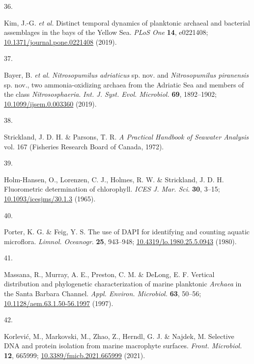 \documentclass[
  12pt,
]{article}
\newlength{\cslhangindent}
\newlength{\csllabelwidth}
\newlength{\cslentryspacingunit} %
\newenvironment{CSLReferences}[2] %
 {%
  \setlength{\parindent}{0pt}
  \ifodd #1
  \let\oldpar\par
  \def\par{\hangindent=\cslhangindent\oldpar}
  \fi
  \setlength{\parskip}{#2\cslentryspacingunit}
 }%
 {}
\newcommand{\CSLLeftMargin}[1]{\parbox[t]{\csllabelwidth}{#1}}
\newcommand{\CSLRightInline}[1]{\parbox[t]{\linewidth - \csllabelwidth}{#1}\break}
\begin{document}
\begin{CSLReferences}{0}{0}
\leavevmode{}%
\CSLLeftMargin{36. }
\CSLRightInline{Kim, J.-G. \emph{et al.} Distinct temporal dynamics of
planktonic archaeal and bacterial assemblages in the bays of the {Yellow
Sea}. \emph{PLoS One} \textbf{14}, e0221408;
\href{https://doi.org/10.1371/journal.pone.0221408}{10.1371/journal.pone.0221408}
(2019).}

\leavevmode{}%
\CSLLeftMargin{37. }
\CSLRightInline{Bayer, B. \emph{et al.} {\emph{Nitrosopumilus
adriaticus}} sp. {nov. and} {\emph{Nitrosopumilus piranensis}} sp.
{nov., two} ammonia-oxidizing archaea from the {Adriatic Sea} and
members of the class {\emph{Nitrososphaeria}}. \emph{Int. J. Syst. Evol.
Microbiol.} \textbf{69}, 1892--1902;
\href{https://doi.org/10.1099/ijsem.0.003360}{10.1099/ijsem.0.003360}
(2019).}

\leavevmode{}%
\CSLLeftMargin{38. }
\CSLRightInline{Strickland, J. D. H. \& Parsons, T. R. \emph{A
{Practical Handbook} of {Seawater Analysis}} vol. 167 ({Fisheries
Research Board of Canada}, 1972).}

\leavevmode{}%
\CSLLeftMargin{39. }
\CSLRightInline{Holm-Hansen, O., Lorenzen, C. J., Holmes, R. W. \&
Strickland, J. D. H. Fluorometric determination of chlorophyll.
\emph{ICES J. Mar. Sci.} \textbf{30}, 3--15;
\href{https://doi.org/10.1093/icesjms/30.1.3}{10.1093/icesjms/30.1.3}
(1965).}

\leavevmode{}%
\CSLLeftMargin{40. }
\CSLRightInline{Porter, K. G. \& Feig, Y. S. The use of {DAPI} for
identifying and counting aquatic microflora. \emph{Limnol. Oceanogr.}
\textbf{25}, 943--948;
\href{https://doi.org/10.4319/lo.1980.25.5.0943}{10.4319/lo.1980.25.5.0943}
(1980).}

\leavevmode{}%
\CSLLeftMargin{41. }
\CSLRightInline{Massana, R., Murray, A. E., Preston, C. M. \& DeLong, E.
F. Vertical distribution and phylogenetic characterization of marine
planktonic {\emph{Archaea}} in the {Santa Barbara Channel}. \emph{Appl.
Environ. Microbiol.} \textbf{63}, 50--56;
\href{https://doi.org/10.1128/aem.63.1.50-56.1997}{10.1128/aem.63.1.50-56.1997}
(1997).}

\leavevmode{}%
\CSLLeftMargin{42. }
\CSLRightInline{Korlević, M., Markovski, M., Zhao, Z., Herndl, G. J. \&
Najdek, M. Selective {DNA} and protein isolation from marine macrophyte
surfaces. \emph{Front. Microbiol.} \textbf{12}, 665999;
\href{https://doi.org/10.3389/fmicb.2021.665999}{10.3389/fmicb.2021.665999}
(2021).}


\end{CSLReferences}
\end{document}
